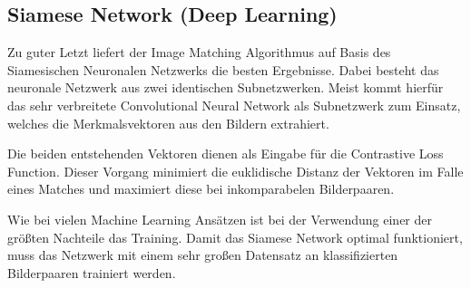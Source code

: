 \subsection{Siamese Network (Deep Learning)}
Zu guter Letzt liefert der Image Matching Algorithmus auf Basis des Siamesischen
Neuronalen Netzwerks die besten Ergebnisse. Dabei besteht das neuronale Netzwerk
aus zwei identischen Subnetzwerken. Meist kommt hierfür das sehr verbreitete
Convolutional Neural Network als Subnetzwerk zum Einsatz, welches die
Merkmalsvektoren aus den Bildern extrahiert. \parencite{siamese-orig-paper}

Die beiden entstehenden Vektoren dienen als Eingabe für die Contrastive Loss
Function. Dieser Vorgang minimiert die euklidische Distanz der Vektoren im Falle
eines Matches und maximiert diese bei inkomparabelen Bilderpaaren.
\parencite{siamese-orig-paper}

Wie bei vielen Machine Learning Ansätzen ist bei der Verwendung einer der
größten Nachteile das Training. Damit das Siamese Network optimal funktioniert,
muss das Netzwerk mit einem sehr großen Datensatz an klassifizierten
Bilderpaaren trainiert werden.
\parencite{mse-naive-approach}